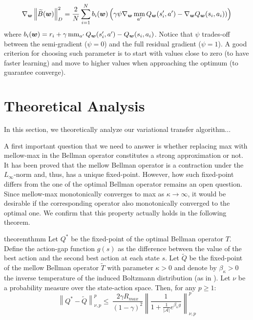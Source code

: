 \documentclass{article}
\newcommand{\mm}{\operatornamewithlimits{mm}}
\newcommand{\wt}[1]{\widetilde{#1}}
\newcommand{\norm}[1]{\left\lVert #1 \right\rVert}
\newcommand{\abs}[1]{\left\lvert #1 \right\rvert}
\begin{document}
\begin{equation}
\nabla_{\bm{w}}\norm{\wt{B}(\bm{w})}_{D}^2 = \frac{2}{N}\sum_{i=1}^N b_i(\bm{w})\left( \gamma\psi\nabla_{\bm{w}}\mm_{a'}Q_{\bm{w}}(s_i',a') - \nabla_{\bm{w}}Q_{\bm{w}}(s_i,a_i)) \right)
\end{equation}
where $b_i(\bm{w}) = r_i + \gamma\mm_{a'}Q_{\bm{w}}(s_i',a') - Q_{\bm{w}}(s_i,a_i)$. Notice that $\psi$ trades-off between the semi-gradient ($\psi = 0$) and the full residual gradient ($\psi = 1$). A good criterion for choosing such parameter is to start with values close to zero (to have faster learning) and move to higher values when approaching the optimum (to guarantee converge).

\section{Theoretical Analysis}\label{sec:theory}

In this section, we theoretically analyze our variational transfer algorithm...

A first important question that we need to answer is whether replacing max with mellow-max in the Bellman operator constitutes a strong approximation or not. It has been proved \cite{}  that the mellow Bellman operator is a contraction under the $L_{\infty}$-norm and, thus, has a unique fixed-point.  However, how such fixed-point differs from the one of the optimal Bellman operator remains an open question. Since mellow-max monotonically converges to max as $\kappa \rightarrow \infty$, it would be desirable if the corresponding operator also monotonically converged to the optimal one. We confirm that this property actually holds in the following theorem.

\begin{restatable}{theorem}{thmm} \label{th:mm}
Let $Q^*$ be the fixed-point of the optimal Bellman operator $T$. Define the action-gap function $g(s)$ as the difference between the value of the best action and the second best action at each state $s$. Let $\wt{Q}$ be the fixed-point of the mellow Bellman operator $\wt{T}$ with parameter $\kappa > 0$ and denote by $\beta_{\kappa} > 0$ the inverse temperature of the induced Boltzmann distribution (as in \cite{asadi2017alternative}). Let $\nu$ be a probability measure over the state-action space. Then, for any $p \geq 1$:
\begin{equation}
\norm{Q^*-\wt{Q}}_{\nu,p}^p \leq\ \frac{2\gamma R_{max}}{(1-\gamma)^2}\norm{\frac{1}{1 + \frac{1}{\abs{\mathcal{A}}}e^{\beta_{\kappa} g}}}_{\nu,p}^p
\end{equation}
\end{restatable}
\end{document}
